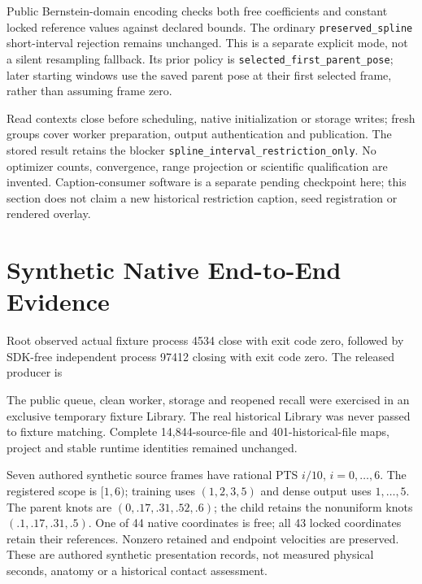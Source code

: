\documentclass[11pt]{article}
\newcommand{\digest}[1]{\texttt{\small\detokenize{#1}}}
\begin{document}
Public Bernstein-domain encoding checks both free coefficients and constant
locked reference values against declared bounds. The ordinary
\texttt{preserved\_spline} short-interval rejection remains unchanged. This is a
separate explicit mode, not a silent resampling fallback. Its prior policy is
\texttt{selected\_\allowbreak first\_\allowbreak parent\_\allowbreak pose}; later starting windows use the saved parent
pose at their first selected frame, rather than assuming frame zero.

Read contexts close before scheduling, native initialization or storage writes;
fresh groups cover worker preparation, output authentication and publication.
The stored result retains the blocker
\texttt{spline\_\allowbreak interval\_\allowbreak restriction\_\allowbreak only}. No optimizer counts, convergence,
range projection or scientific qualification are invented. Caption-consumer
software is a separate pending checkpoint here; this section does not claim a
new historical restriction caption, seed registration or rendered overlay.

\newpage
\begingroup\small
\section*{Synthetic Native End-to-End Evidence}
Root observed actual fixture process 4534 close with exit code zero, followed by
SDK-free independent process 97412 closing with exit code zero. The released
producer is
\begin{center}\digest{5197f8639818321b7cf8f86d4748a25ce79aa278}\end{center}
The public queue, clean worker, storage and reopened recall were exercised in
an exclusive temporary fixture Library. The real historical Library was never
passed to fixture matching. Complete 14,844-source-file and 401-historical-file
maps, project and stable runtime identities remained unchanged.

Seven authored synthetic source frames have rational PTS $i/10$, $i=0,\ldots,6$.
The registered scope is $[1,6)$; training uses $(1,2,3,5)$ and dense output uses
$1,\ldots,5$. The parent knots are $(0,.17,.31,.52,.6)$; the child retains the
nonuniform knots $(.1,.17,.31,.5)$. One of 44 native coordinates is free;
all 43 locked coordinates retain their references. Nonzero retained and endpoint
velocities are preserved. These are authored synthetic presentation records,
not measured physical seconds, anatomy or a historical contact assessment.
\end{document}

